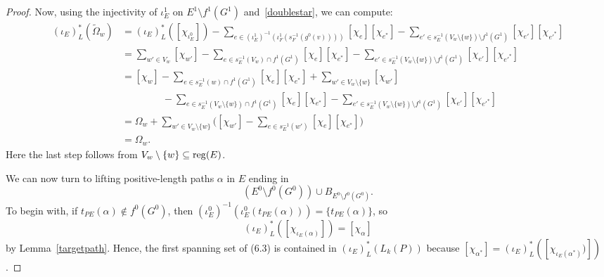 \documentclass[12pt,times,a4paper]{amsart}
\numberwithin{equation}{section}
\numberwithin{equation}{section}
\begin{document}
\begin{proof}
Now, using the injectivity of $\iota_E^1$ on $E^1\setminus f^1(G^1)$ and~\eqref{doublestar}, we can compute:
\begin{align}
(\iota_E)^*_L(\widetilde{\Omega}_w)&=(\iota_E)^*_L([\chi_{\iota_E^0}])-\!\!\!\!\!\!\!\!\!\!\!\!\!\!\sum_{e\in (\iota_E^1)^{-1}(\iota_F^1(s_F^{-1}(g^0(v))))}
\!\!\!\!\!\!\!\!\!\!\!\!\!\!
[\chi_e][\chi_{e^*}]-\!\!\!\!\!\!\!\sum_{e'\in s_E^{-1}(V_w\setminus\{w\})\setminus f^1(G^1)}\!\!\!\!\!\!\![\chi_{e'}][\chi_{e'^*}]
\nonumber \\
&=\sum_{w'\in V_w}[\chi_{w'}]-\!\!\!\!\!\!\sum_{e\in s_E^{-1}(V_w)\cap f^1(G^1)}\!\!\!\!\!\![\chi_e][\chi_{e^*}]-
\!\!\!\!\!\!\sum_{e'\in s_E^{-1}(V_w\setminus\{w\})\setminus f^1(G^1)}\!\!\!\!\!\!
[\chi_{e'}][\chi_{e'^*}]
\nonumber\\
&=[\chi_w]-\!\!\!\!\!\!\!\sum_{e\in s_E^{-1}(w)\cap f^1(G^1)}\!\!\!\!\!\!\![\chi_e][\chi_{e^*}]+
\!\!\!\!\sum_{w'\in V_w\setminus\{w\}}\!\!\!\![\chi_{w'}]
\nonumber\\
&\phantom{=[\chi_w].}-\!\!\!\!\!\!\sum_{e\in s_E^{-1}(V_w\setminus\{w\})\cap f^1(G^1)}\!\!\!\!\!\![\chi_e][\chi_{e^*}]
-\!\!\!\!\!\sum_{e'\in s_E^{-1}(V_w\setminus\{w\})\setminus f^1(G^1)}\!\!\!\!\![\chi_{e'}][\chi_{e'^*}]
\nonumber \\
&=\Omega_w+\!\!\!\sum_{w'\in V_w\setminus\{w\}}\!\!\!\Big([\chi_{w'}]-\!\!\!\!\!\sum_{e\in s_E^{-1}(w')}\!\!\!\!\![\chi_e][\chi_{e^*}]\Big)
\nonumber\\
&=\Omega_w.
\end{align}
Here the last step follows from $V_w\setminus\{w\}\subseteq {\rm reg}(E)$.

We can now turn to lifting positive-length paths $\alpha$ in $E$ ending in 
\begin{equation}
(E^0\setminus f^0(G^0))\cup B_{E^0\setminus f^0(G^0)}.
\end{equation}
To begin with, if $t_{PE}(\alpha)\notin f^0(G^0)$, then $(\iota_E^0)^{-1}(\iota_E^0(t_{PE}(\alpha)))=\{t_{PE}(\alpha)\}$, so \begin{equation}
(\iota_E)^*_L([\chi_{\iota_E(\alpha)}])=[\chi_\alpha]
\end{equation}
by Lemma~\ref{targetpath}. Hence, the first spanning set of (6.3) is contained in $(\iota_E)^*_L(L_k(P))$ because 
$[\chi_{\alpha^*}]=(\iota_E)^*_L([\chi_{\iota_E(\alpha^*)})])$. 


\end{proof}
\end{document}
